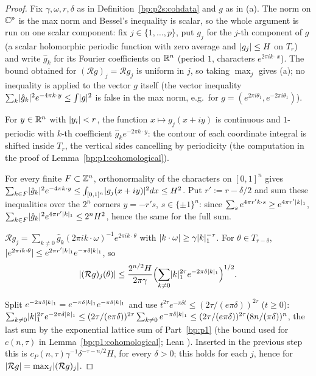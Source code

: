 \begin{proof}
Fix $\gamma,\omega,r,\delta$ as in Definition~\ref{bp:p2s:cohdata} and $g$ as in (a). The norm on $\mathbb{C}^p$ is the max norm
and Bessel's inequality is scalar, so the whole argument is run on one scalar component: fix $j\in\{1,\dots,p\}$, put $g_j$
for the $j$-th component of $g$ (a scalar holomorphic periodic function with zero average and $\lvert g_j\rvert\le H$ on $T_r$)
and write $\hat g_k$ for its Fourier coefficients on $\mathbb{R}^n$ (period $1$, characters $e^{2\pi ik\cdot x}$). The bound
obtained for $(\mathcal Rg)_j=\mathcal R g_j$ is uniform in $j$, so taking $\max_j$ gives (a); no inequality is applied
to the vector $g$ itself (the vector inequality $\sum_k\lvert \hat g_k\rvert^2e^{-4\pi k\cdot y}\le\int\lvert g\rvert^2$ is false in the
max norm, e.g.\ for $g=(e^{2\pi i\theta_1},e^{-2\pi i\theta_1})$).

\label{step:p2s:cp-shift}
For $y\in\mathbb{R}^n$ with $\lvert y_i\rvert<r$, the function $x\mapsto g_j(x+iy)$ is continuous and $1$-periodic with $k$-th
coefficient $\hat g_ke^{-2\pi k\cdot y}$: the contour of each coordinate integral is shifted inside $T_r$, the
vertical sides cancelling by periodicity (the computation in the proof of Lemma~\ref{bp:p1:cohomological}).

\label{step:p2s:cp-bessel}
For every finite $F\subset\mathbb{Z}^n$, orthonormality of the characters on $[0,1]^n$ gives
$\sum_{k\in F}\lvert \hat g_k\rvert^2e^{-4\pi k\cdot y}\le\int_{[0,1]^n}\lvert g_j(x+iy)\rvert^2dx\le H^2$. Put $r':=r-\delta/2$ and sum
these inequalities over the $2^n$ corners $y=-r's$, $s\in\{\pm1\}^n$: since $\sum_se^{4\pi r'k\cdot s}\ge
e^{4\pi r'\lvert k\rvert_1}$, $\sum_{k\in F}\lvert \hat g_k\rvert^2e^{4\pi r'\lvert k\rvert_1}\le2^nH^2$, hence the same for the full sum.

\label{step:p2s:cp-cs}
$\mathcal Rg_j=\sum_{k\ne0}\hat g_k(2\pi ik\cdot\omega)^{-1}e^{2\pi ik\cdot\theta}$ with $\lvert k\cdot\omega\rvert\ge\gamma\lvert k\rvert_1^{-\tau}$. For $\theta\in T_{r-\delta}$, $\lvert e^{2\pi ik\cdot\theta}\rvert\le e^{2\pi r'\lvert k\rvert_1}e^{-\pi\delta\lvert k\rvert_1}$, so
\[
\lvert (\mathcal Rg)_j(\theta)\rvert\le\frac{2^{n/2}H}{2\pi\gamma}\Bigl(\sum_{k\ne0}\lvert k\rvert_1^{2\tau}e^{-2\pi\delta\lvert k\rvert_1}\Bigr)^{1/2}.
\]

\label{step:p2s:cp-lattice}
Split $e^{-2\pi\delta\lvert k\rvert_1}=e^{-\pi\delta\lvert k\rvert_1}e^{-\pi\delta\lvert k\rvert_1}$ and use $t^{2\tau}e^{-\pi\delta t}\le(2\tau/(e\pi\delta))^{2\tau}$ ($t\ge0$):
$\sum_{k\ne0}\lvert k\rvert_1^{2\tau}e^{-2\pi\delta\lvert k\rvert_1}\le(2\tau/(e\pi\delta))^{2\tau}\sum_{k\ne0}e^{-\pi\delta\lvert k\rvert_1}\le(2\tau/(e\pi\delta))^{2\tau}(8n/(\pi\delta))^n$, the last
sum by the exponential lattice sum of Part~\ref{bp:p1} (the bound used for $c(n,\tau)$ in Lemma~\ref{bp:p1:cohomological}; Lean
). Inserted in the previous step this is $c_P(n,\tau)\gamma^{-1}\delta^{-\tau-n/2}H$, for every
$\delta>0$; this holds for each $j$, hence for $\lvert \mathcal Rg\rvert=\max_j\lvert (\mathcal Rg)_j\rvert$.


\end{proof}

